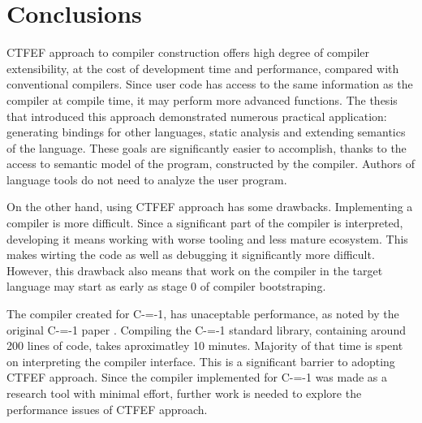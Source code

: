 \section{Conclusions}

CTFEF approach to compiler construction offers high degree of compiler extensibility, at the cost of development time and performance, compared with conventional compilers.
Since user code has access to the same information as the compiler at compile time, it may perform more advanced functions.
The thesis that introduced this approach \cite{grabski2020} demonstrated numerous practical application: generating bindings for other languages, static analysis and extending semantics of the language.
These goals are significantly easier to accomplish, thanks to the access to semantic model of the program, constructed by the compiler.
Authors of language tools do not need to analyze the user program.

On the other hand, using CTFEF approach has some drawbacks. Implementing a compiler is more difficult.
Since a significant part of the compiler is interpreted, developing it means working with worse tooling and less mature ecosystem.
This makes wirting the code as well as debugging it significantly more difficult.
However, this drawback also means that work on the compiler in the target language may start as early as stage 0 of compiler bootstraping\cite{puntambekar:compiler_design, novillo2007gcc}.

The compiler created for C-=-1, has unaceptable performance, as noted by the original C-=-1 paper \cite{grabski2022compilation}.
Compiling the C-=-1 standard library, containing around 200 lines of code, takes aproximatley 10 minutes.
Majority of that time is spent on interpreting the compiler interface.
This is a significant barrier to adopting CTFEF approach.
Since the compiler implemented for C-=-1 was made as a research tool with minimal effort, further work is needed to explore the performance issues of CTFEF approach.
